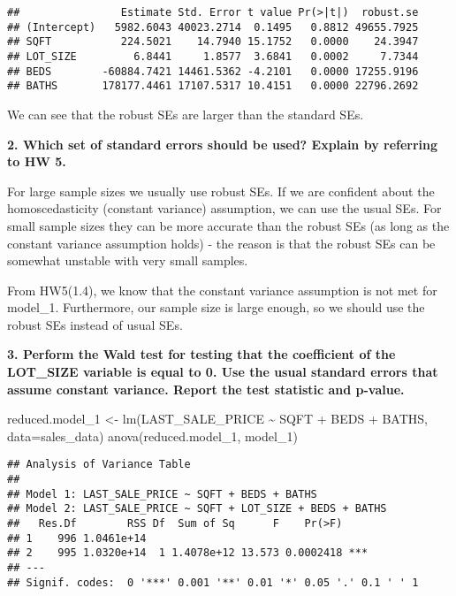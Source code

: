 \documentclass[
]{article}
\newenvironment{Shaded}{\begin{snugshade}}{\end{snugshade}}
\newcommand{\AttributeTok}[1]{\textcolor[rgb]{0.77,0.63,0.00}{#1}}
\newcommand{\FunctionTok}[1]{\textcolor[rgb]{0.00,0.00,0.00}{#1}}
\newcommand{\NormalTok}[1]{#1}
\newcommand{\OtherTok}[1]{\textcolor[rgb]{0.56,0.35,0.01}{#1}}
\newcommand{\SpecialCharTok}[1]{\textcolor[rgb]{0.00,0.00,0.00}{#1}}
\begin{document}
\begin{verbatim}
##                Estimate Std. Error t value Pr(>|t|)  robust.se
## (Intercept)   5982.6043 40023.2714  0.1495   0.8812 49655.7925
## SQFT           224.5021    14.7940 15.1752   0.0000    24.3947
## LOT_SIZE         6.8441     1.8577  3.6841   0.0002     7.7344
## BEDS        -60884.7421 14461.5362 -4.2101   0.0000 17255.9196
## BATHS       178177.4461 17107.5317 10.4151   0.0000 22796.2692
\end{verbatim}

We can see that the robust SEs are larger than the standard SEs.

\textbf{2. Which set of standard errors should be used? Explain by
referring to HW 5.}

For large sample sizes we usually use robust SEs. If we are confident
about the homoscedasticity (constant variance) assumption, we can use
the usual SEs. For small sample sizes they can be more accurate than the
robust SEs (as long as the constant variance assumption holds) - the
reason is that the robust SEs can be somewhat unstable with very small
samples.

From HW5(1.4), we know that the constant variance assumption is not met
for model\_1. Furthermore, our sample size is large enough, so we should
use the robust SEs instead of usual SEs.

\textbf{3. Perform the Wald test for testing that the coefficient of the
LOT\_SIZE variable is equal to 0. Use the usual standard errors that
assume constant variance. Report the test statistic and p-value.}

\begin{Shaded}
\begin{Highlighting}[]
\NormalTok{reduced.model\_1 }\OtherTok{\textless{}{-}} \FunctionTok{lm}\NormalTok{(LAST\_SALE\_PRICE }\SpecialCharTok{\textasciitilde{}}\NormalTok{ SQFT }\SpecialCharTok{+}\NormalTok{ BEDS }\SpecialCharTok{+}\NormalTok{ BATHS, }\AttributeTok{data=}\NormalTok{sales\_data)}
\FunctionTok{anova}\NormalTok{(reduced.model\_1, model\_1)}
\end{Highlighting}
\end{Shaded}

\begin{verbatim}
## Analysis of Variance Table
## 
## Model 1: LAST_SALE_PRICE ~ SQFT + BEDS + BATHS
## Model 2: LAST_SALE_PRICE ~ SQFT + LOT_SIZE + BEDS + BATHS
##   Res.Df        RSS Df  Sum of Sq      F    Pr(>F)    
## 1    996 1.0461e+14                                   
## 2    995 1.0320e+14  1 1.4078e+12 13.573 0.0002418 ***
## ---
## Signif. codes:  0 '***' 0.001 '**' 0.01 '*' 0.05 '.' 0.1 ' ' 1
\end{verbatim}
\end{document}
